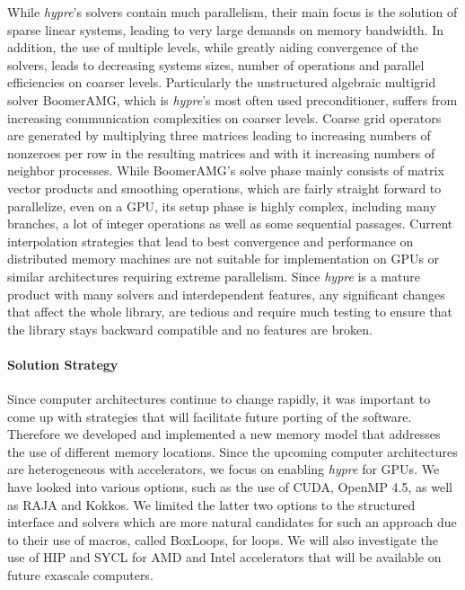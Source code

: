 While {\sl hypre}'s solvers contain much parallelism, their main focus is the solution of sparse linear systems, leading to  very large demands on memory bandwidth. In addition, the use of multiple levels, while greatly aiding convergence of the solvers, leads to decreasing systems sizes, number of operations and parallel efficiencies on coarser levels. Particularly the unstructured algebraic multigrid solver BoomerAMG\cite{HeYa2002}, which is {\sl hypre}'s most often used preconditioner, suffers from increasing communication complexities on coarser levels. Coarse grid operators are generated by multiplying three matrices leading to increasing numbers of nonzeroes per row in the resulting matrices and with it increasing numbers of neighbor processes. While BoomerAMG's solve phase mainly consists of matrix vector products and smoothing operations, which are fairly straight forward to parallelize, even on a GPU, its setup phase is highly complex, including many branches, a lot of integer operations as well as some sequential passages. Current  interpolation strategies that lead to best convergence and performance on distributed memory machines are not suitable for implementation on GPUs or similar architectures requiring extreme parallelism. Since {\sl hypre} is a mature product with many solvers and interdependent features, any significant changes that affect the whole library, are tedious and require much testing to ensure that the library stays backward compatible and no features are broken.

\paragraph{Solution Strategy}

Since computer architectures continue to change rapidly, it was important to come up with strategies that will facilitate future porting of the software. Therefore we developed and implemented a new memory model that addresses the use of different memory locations.
Since the upcoming computer architectures are heterogeneous with accelerators, we focus on enabling {\sl hypre} for GPUs. We have looked into various options, such as the use of CUDA, OpenMP 4.5, as well as RAJA and Kokkos. We limited the latter two options to the structured interface and solvers which are more natural candidates for such an approach due to their use of macros, called BoxLoops, for loops. We will also investigate the use of HIP and SYCL for AMD and Intel accelerators that will be available on future exascale computers.

